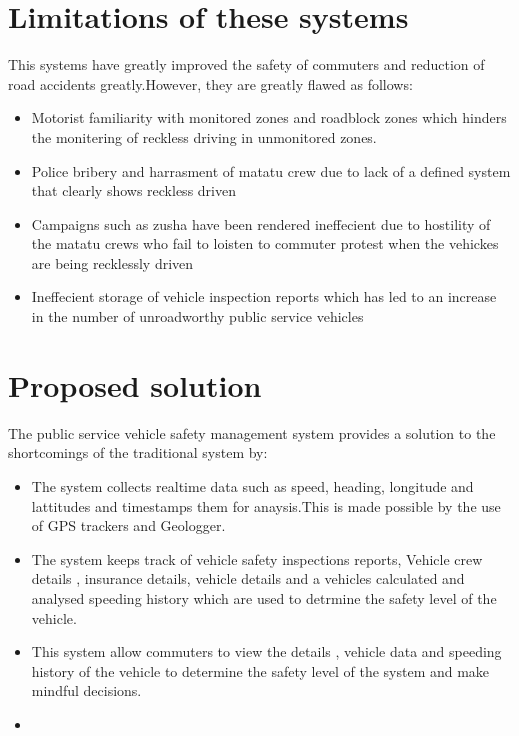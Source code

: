 \documentclass[a4paper, 12pt]{report}
\begin{document}
\section{Limitations of these systems}
\noindent This systems have greatly improved the safety of commuters and reduction of road
accidents greatly.However, they are greatly flawed as follows:
\begin{itemize}
\item Motorist familiarity with monitored zones and roadblock zones which hinders
the monitering of reckless driving in unmonitored zones.
\item Police bribery and harrasment of matatu crew due to lack of a defined system
that clearly shows reckless driven
\item Campaigns such as zusha have been rendered ineffecient due to hostility of the matatu crews who fail to loisten to commuter protest when the vehickes are being recklessly driven
\item Ineffecient storage of vehicle inspection reports which has led to an increase
in the number of unroadworthy public service vehicles

\end{itemize}
\section{Proposed solution}

\noindent The public service vehicle safety management system provides a solution to the shortcomings of the traditional system by:
\begin{itemize}
\item The system collects realtime data such as speed, heading, longitude and
lattitudes and timestamps them for anaysis.This is made possible by the use
of GPS trackers and Geologger.
\item The system keeps track of vehicle safety inspections reports, Vehicle crew
details , insurance details, vehicle details and a vehicles calculated and analysed speeding history which are used to detrmine the safety level of the
vehicle.
\item This system allow commuters to view the details , vehicle data and speeding
history of the vehicle to determine the safety level of the system and make
mindful decisions.
\item 
\end{itemize}
\end{document}
